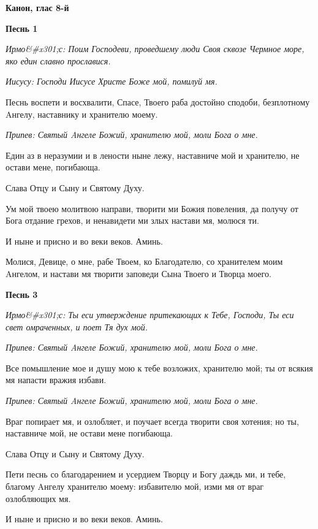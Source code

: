 \bfseries Канон, глас 8-й\normalfont{}




\bfseries Песнь 1\normalfont{}


\itshape Ирмо&#x301;с:\normalfont{} Поим Господеви, проведшему люди Своя сквозе Чермное море, яко един славно прославися.


\itshape Иисусу:\normalfont{} Господи Иисусе Христе Боже мой, помилуй мя.


Песнь воспети и восхвалити, Спасе, Твоего раба достойно сподоби, безплотному Aнгелу, наставнику и хранителю моему.


\itshape Припев:\normalfont{} Святый Aнгеле Божий, хранителю мой, моли Бога о мне.


Един аз в неразумии и в лености ныне лежу, наставниче мой и хранителю, не остави мене, погибающа.


Слава Отцу и Сыну и Святому Духу.


Ум мой твоею молитвою направи, творити ми Божия повеления, да получу от Бога отдание грехов, и ненавидети ми злых настави мя, молюся ти.


И ныне и присно и во веки веков. Аминь.


Молися, Девице, о мне, рабе Твоем, ко Благодателю, со хранителем моим Aнгелом, и настави мя творити заповеди Сына Твоего и Творца моего.




\bfseries Песнь 3\normalfont{}


\itshape Ирмо&#x301;с:\normalfont{} Ты еси утверждение притекающих к Тебе, Господи, Ты еси свет омраченных, и поет Тя дух мой.


\itshape Припев:\normalfont{} Святый Aнгеле Божий, хранителю мой, моли Бога о мне.


Все помышление мое и душу мою к тебе возложих, хранителю мой; ты от всякия мя напасти вражия избави.


\itshape Припев:\normalfont{} Святый Aнгеле Божий, хранителю мой, моли Бога о мне.


Враг попирает мя, и озлобляет, и поучает всегда творити своя хотения; но ты, наставниче мой, не остави мене погибающа.


Слава Отцу и Сыну и Святому Духу.


Пети песнь со благодарением и усердием Творцу и Богу даждь ми, и тебе, благому Aнгелу хранителю моему: избавителю мой, изми мя от враг озлобляющих мя.


И ныне и присно и во веки веков. Аминь.


